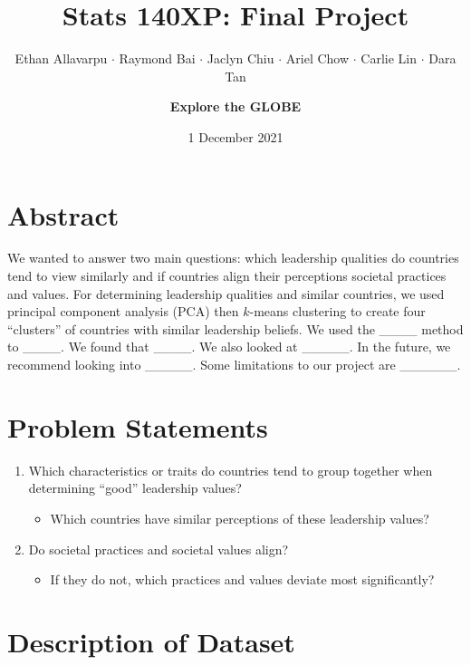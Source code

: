 \documentclass[
]{article}
\title{Stats 140XP: Final Project}
\author{Ethan Allavarpu \(\cdot\) Raymond Bai \(\cdot\) Jaclyn Chiu
\(\cdot\) Ariel Chow \(\cdot\) Carlie Lin \(\cdot\) Dara
Tan \and \textbf{Explore the GLOBE}}
\date{1 December 2021}
\providecommand{\tightlist}{%
  \setlength{\itemsep}{0pt}\setlength{\parskip}{0pt}}
\begin{document}
\maketitle

{
\setcounter{tocdepth}{1}
\tableofcontents
}
\vfill

\newpage

\hypertarget{abstract}{%
\section{Abstract}\label{abstract}}

We wanted to answer two main questions: which leadership qualities do
countries tend to view similarly and if countries align their
perceptions societal practices and values. For determining leadership
qualities and similar countries, we used principal component analysis
(PCA) then \(k\)-means clustering to create four ``clusters'' of
countries with similar leadership beliefs. We used the \_\_\_\_ method
to \_\_\_\_. We found that \_\_\_\_. We also looked at \_\_\_\_\_. In
the future, we recommend looking into \_\_\_\_\_. Some limitations to
our project are \_\_\_\_\_\_.

\hypertarget{problem-statements}{%
\section{Problem Statements}\label{problem-statements}}

\begin{enumerate}
\def\labelenumi{\arabic{enumi}.}
\tightlist
\item
  Which characteristics or traits do countries tend to group together
  when determining ``good'' leadership values?

  \begin{itemize}
  \tightlist
  \item
    Which countries have similar perceptions of these leadership values?
  \end{itemize}
\item
  Do societal practices and societal values align?

  \begin{itemize}
  \tightlist
  \item
    If they do not, which practices and values deviate most
    significantly?
  \end{itemize}
\end{enumerate}

\hypertarget{description-of-dataset}{%
\section{Description of Dataset}\label{description-of-dataset}}
\end{document}
